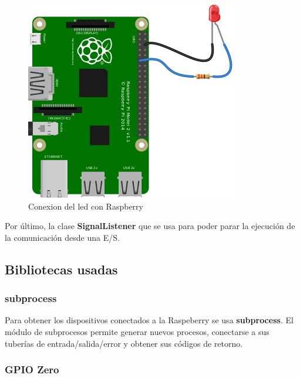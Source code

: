 \begin{figure}[p]
    \centering
    \includegraphics[width=\linewidth]{imagenes/led_bb.png}
    \caption{Conexion del led con Raspberry \cite{raspberry-led}}
    \label{fig:figure12}
\end{figure}

Por último, la clase \textbf{SignalListener} que se usa para poder parar la ejecución de la comunicación desde una E/S. \\

\subsection{Bibliotecas usadas}

\subsubsection{subprocess}

Para obtener los dispositivos conectados a la Raspeberry se usa \textbf{subprocess}. El módulo de subprocesos permite generar nuevos procesos, conectarse a sus tuberías de entrada/salida/error y obtener sus códigos de retorno. \cite{subprocess}

\subsubsection{GPIO Zero}

